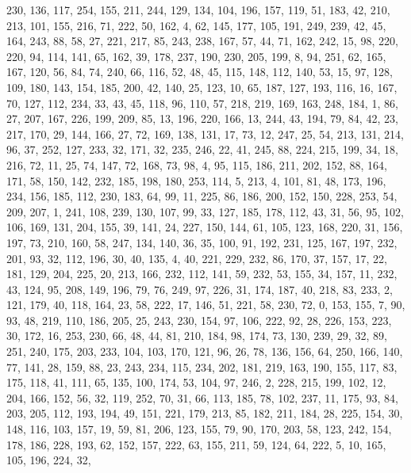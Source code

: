\begin{DoxyCode}
       230, 136, 117, 254, 155, 211, 244, 129, 134, 104, 196, 157, 119, 51, 183, 42, 210, 213, 101, 155, 216, 71,
       222, 50, 162, 4, 62, 145, 177, 105, 191, 249, 239, 42, 45, 164, 243, 88, 58, 27, 221, 217, 85, 243, 238, 167,
       57, 44, 71, 162, 242, 15, 98, 220, 220, 94, 114, 141, 65, 162, 39, 178, 237, 190, 230, 205, 199, 8, 94,
       251, 62, 165, 167, 120, 56, 84, 74, 240, 66, 116, 52, 48, 45, 115, 148, 112, 140, 53, 15, 97, 128, 109, 180,
       143, 154, 185, 200, 42, 140, 25, 123, 10, 65, 187, 127, 193, 116, 16, 167, 70, 127, 112, 234, 33, 43, 45, 118,
       96, 110, 57, 218, 219, 169, 163, 248, 184, 1, 86, 27, 207, 167, 226, 199, 209, 85, 13, 196, 220, 166, 13,
       244, 43, 194, 79, 84, 42, 23, 217, 170, 29, 144, 166, 27, 72, 169, 138, 131, 17, 73, 12, 247, 25, 54, 213,
       131, 214, 96, 37, 252, 127, 233, 32, 171, 32, 235, 246, 22, 41, 245, 88, 224, 215, 199, 34, 18, 216, 72, 11,
       25, 74, 147, 72, 168, 73, 98, 4, 95, 115, 186, 211, 202, 152, 88, 164, 171, 58, 150, 142, 232, 185, 198, 180,
       253, 114, 5, 213, 4, 101, 81, 48, 173, 196, 234, 156, 185, 112, 230, 183, 64, 99, 11, 225, 86, 186, 200,
       152, 150, 228, 253, 54, 209, 207, 1, 241, 108, 239, 130, 107, 99, 33, 127, 185, 178, 112, 43, 31, 56, 95, 102,
       106, 169, 131, 204, 155, 39, 141, 24, 227, 150, 144, 61, 105, 123, 168, 220, 31, 156, 197, 73, 210, 160,
       58, 247, 134, 140, 36, 35, 100, 91, 192, 231, 125, 167, 197, 232, 201, 93, 32, 112, 196, 30, 40, 135, 4, 40,
       221, 229, 232, 86, 170, 37, 157, 17, 22, 181, 129, 204, 225, 20, 213, 166, 232, 112, 141, 59, 232, 53, 155,
       34, 157, 11, 232, 43, 124, 95, 208, 149, 196, 79, 76, 249, 97, 226, 31, 174, 187, 40, 218, 83, 233, 2, 121,
       179, 40, 118, 164, 23, 58, 222, 17, 146, 51, 221, 58, 230, 72, 0, 153, 155, 7, 90, 93, 48, 219, 110, 186,
       205, 25, 243, 230, 154, 97, 106, 222, 92, 28, 226, 153, 223, 30, 172, 16, 253, 230, 66, 48, 44, 81, 210, 184,
       98, 174, 73, 130, 239, 29, 32, 89, 251, 240, 175, 203, 233, 104, 103, 170, 121, 96, 26, 78, 136, 156, 64,
       250, 166, 140, 77, 141, 28, 159, 88, 23, 243, 234, 115, 234, 202, 181, 219, 163, 190, 155, 117, 83, 175, 118,
       41, 111, 65, 135, 100, 174, 53, 104, 97, 246, 2, 228, 215, 199, 102, 12, 204, 166, 152, 56, 32, 119, 252, 70,
       31, 66, 113, 185, 78, 102, 237, 11, 175, 93, 84, 203, 205, 112, 193, 194, 49, 151, 221, 179, 213, 85, 182,
       211, 184, 28, 225, 154, 30, 148, 116, 103, 157, 19, 59, 81, 206, 123, 155, 79, 90, 170, 203, 58, 123, 242,
       154, 178, 186, 228, 193, 62, 152, 157, 222, 63, 155, 211, 59, 124, 64, 222, 5, 10, 165, 105, 196, 224, 32,

\end{DoxyCode}
